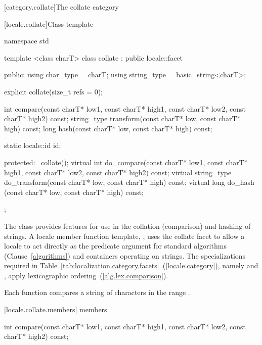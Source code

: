 [category.collate]{The collate category}

[locale.collate]{Class template }

%
\begin{codeblock}
namespace std {
  template <class charT>
  class collate : public locale::facet {
  public:
    using char_type   = charT;
    using string_type = basic_string<charT>;

    explicit collate(size_t refs = 0);

    int compare(const charT* low1, const charT* high1,
                const charT* low2, const charT* high2) const;
    string_type transform(const charT* low, const charT* high) const;
    long hash(const charT* low, const charT* high) const;

    static locale::id id;

  protected:
    ~collate();
    virtual int do_compare(const charT* low1, const charT* high1,
                           const charT* low2, const charT* high2) const;
    virtual string_type do_transform(const charT* low, const charT* high) const;
    virtual long do_hash (const charT* low, const charT* high) const;
  };
}
\end{codeblock}

\pnum
The class
provides features for use in the
collation (comparison) and hashing of strings.
A locale member function template,
,
uses the collate facet to allow a locale to act directly as the predicate
argument for standard algorithms (Clause~\ref{algorithms}) and containers operating on strings.
The specializations required in Table~\ref{tab:localization.category.facets}~(\ref{locale.category}), namely
and
,
apply lexicographic ordering~(\ref{alg.lex.comparison}).

\pnum
Each function compares a string of characters
in the range
.

[locale.collate.members]{ members}

%
%
\begin{itemdecl}
int compare(const charT* low1, const charT* high1,
            const charT* low2, const charT* high2) const;
\end{itemdecl}

\begin{itemdescr}
\pnum
\returns
{}
\end{itemdescr}

